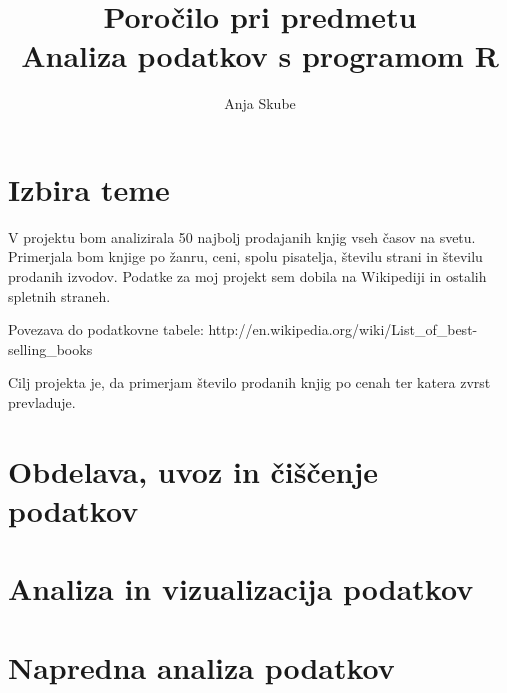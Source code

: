 \documentclass[11pt,a4paper]{article}
\begin{document}
\title{Poročilo pri predmetu \\
Analiza podatkov s programom R}
\author{Anja Skube}
\maketitle

\section{Izbira teme}
V projektu bom analizirala 50 najbolj prodajanih knjig vseh časov na svetu. Primerjala bom knjige po žanru, ceni, spolu pisatelja, številu strani in številu prodanih izvodov.  
Podatke za moj projekt sem dobila na Wikipediji in ostalih spletnih straneh.

Povezava do podatkovne tabele:
http://en.wikipedia.org/wiki/List_of_best-selling_books

Cilj projekta je, da primerjam število prodanih knjig po cenah ter katera zvrst prevladuje. 

\section{Obdelava, uvoz in čiščenje podatkov}

\section{Analiza in vizualizacija podatkov}



\section{Napredna analiza podatkov}
\end{document}
